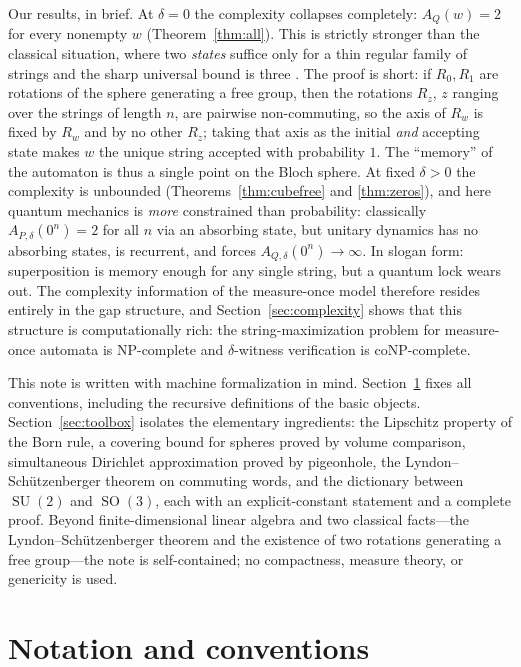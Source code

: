 \documentclass[11pt]{amsart}
\theoremstyle{definition}
\theoremstyle{remark}
\newcommand{\AQ}{A_Q}
\DeclareMathOperator{\SO}{SO}
\DeclareMathOperator{\SU}{SU}
\begin{document}
Our results, in brief. At $\delta=0$ the complexity collapses
completely: $\AQ(w)=2$ for every nonempty $w$
(Theorem~\ref{thm:all}). This is strictly stronger than the classical
situation, where two \emph{states} suffice only for a thin regular
family of strings \cite[Theorem~4.1]{Gill24} and the sharp universal
bound is three \cite{KHpfa}. The proof is short: if $R_0,R_1$ are
rotations of the sphere generating a free group, then the rotations
$R_z$, $z$ ranging over the strings of length $n$, are pairwise
non-commuting, so the axis of $R_w$ is fixed by $R_w$ and by no other
$R_z$; taking that axis as the initial \emph{and} accepting state
makes $w$ the unique string accepted with probability $1$. The
``memory'' of the automaton is thus a single point on the Bloch
sphere. At fixed $\delta>0$ the complexity is unbounded
(Theorems~\ref{thm:cubefree} and \ref{thm:zeros}), and here quantum
mechanics is \emph{more} constrained than probability: classically
$A_{P,\delta}(0^n)=2$ for all $n$ via an absorbing state, but unitary
dynamics has no absorbing states, is recurrent, and forces
$A_{Q,\delta}(0^n)\to\infty$. In slogan form: superposition is memory
enough for any single string, but a quantum lock wears out. The
complexity information of the measure-once model therefore resides
entirely in the gap structure, and Section~\ref{sec:complexity} shows
that this structure is computationally rich: the string-maximization
problem for measure-once automata is NP-complete and
$\delta$-witness verification is coNP-complete.

This note is written with machine formalization in mind.
Section~\ref{sec:notation} fixes all conventions, including the
recursive definitions of the basic objects.
Section~\ref{sec:toolbox} isolates the elementary ingredients: the
Lipschitz property of the Born rule, a covering bound for spheres
proved by volume comparison, simultaneous Dirichlet approximation
proved by pigeonhole, the Lyndon--Sch\"utzenberger theorem on
commuting words, and the dictionary between $\SU(2)$ and $\SO(3)$,
each with an explicit-constant statement and a complete proof. Beyond
finite-dimensional linear algebra and two classical facts---the
Lyndon--Sch\"utzenberger theorem and the existence of two rotations
generating a free group---the note is self-contained; no compactness,
measure theory, or genericity is used.

\section{Notation and conventions}\label{sec:notation}
\end{document}
